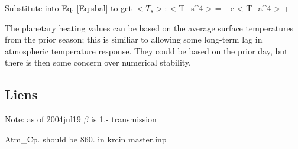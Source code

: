 Substitute into Eq. \ref{Eq:sbal} to get $<T_s>$:
\qbn < T_s^4 > =  \beta_e < T_a^4 > +   \qen

 
The planetary heating values can be based on the average surface temperatures
from the prior season; this is similiar to allowing some long-term lag in
atmospheric temperature response. They could be based on the prior day, but
there is then some concern over numerical stability.

\subsection{Liens}

Note: as of 2004jul19  $\beta$ is 1.- transmission

 Atm\_Cp.  should be 860. in krcin master.inp
